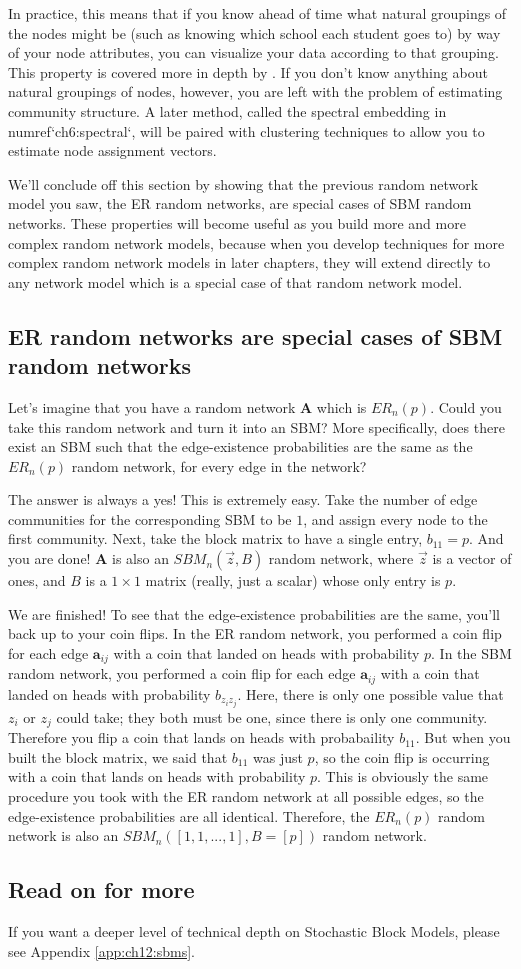 In practice, this means that if you know ahead of time what natural groupings of the nodes might be (such as knowing which school each student goes to) by way of your node attributes, you can visualize your data according to that grouping. This property is covered more in depth by \cite{Abbe2017Mar}. If you don't know anything about natural groupings of nodes, however, you are left with the problem of {estimating community structure}. A later method, called the {spectral embedding} in {numref}`ch6:spectral`, will be paired with clustering techniques to allow you to estimate node assignment vectors. 

We'll conclude off this section by showing that the previous random network model you saw, the ER random networks, are special cases of SBM random networks. These properties will become useful as you build more and more complex random network models, because when you develop techniques for more complex random network models in later chapters, they will extend directly to any network model which is a special case of that random network model.

\subsection{ER random networks are special cases of SBM random networks}

Let's imagine that you have a random network $\mathbf A$ which is $ER_n(p)$. Could you take this random network and turn it into an SBM? More specifically, does there exist an SBM such that the edge-existence probabilities are the same as the $ER_n(p)$ random network, for {every} edge in the network?

The answer is {always} a yes! This is extremely easy. Take the number of edge communities for the corresponding SBM to be $1$, and assign every node to the first community. Next, take the block matrix to have a single entry, $b_{11} = p$. And you are done! $\mathbf A$ is also an $SBM_n(\vec z, B)$ random network, where $\vec z$ is a vector of ones, and $B$ is a $1 \times 1$ matrix (really, just a scalar) whose only entry is $p$.

We are finished! To see that the edge-existence probabilities are the same, you'll back up to your coin flips. In the ER random network, you performed a coin flip for each edge $\mathbf a_{ij}$ with a coin that landed on heads with probability $p$. In the SBM random network, you performed a coin flip for each edge $\mathbf a_{ij}$ with a coin that landed on heads with probability $b_{z_i z_j}$. Here, there is only one possible value that $z_i$ or $z_j$ could take; they both must be one, since there is only one community. Therefore you flip a coin that lands on heads with probabaility $b_{11}$. But when you built the block matrix, we said that $b_{11}$ was just $p$, so the coin flip is occurring with a coin that lands on heads with probability $p$. This is obviously the same procedure you took with the ER random network at all possible edges, so the edge-existence probabilities are all identical. Therefore, the $ER_n(p)$ random network is also an $SBM_n([1, 1, ..., 1], B = [p])$ random network.

\subsection{Read on for more}

If you want a deeper level of technical depth on Stochastic Block Models, please see Appendix \ref{app:ch12:sbms}.


\newpage